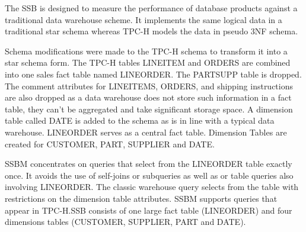 The  SSB  is  designed  to  measure the performance  of  database products  against  a  traditional  data  warehouse  scheme.  It  implements  the  same  logical  data  in  a  traditional  star  schema whereas TPC-H models the data in pseudo 3NF schema.

Schema  modifications  were  made  to  the  TPC-H  schema to transform  it  into  a star  schema  form.  The TPC-H tables LINEITEM and ORDERS are combined into one sales fact table named LINEORDER. The PARTSUPP table  is  dropped.  The comment  attributes  for LINEITEMS, ORDERS,  and  shipping instructions  are  also  dropped  as  a  data  warehouse  does  not store such information in a fact table, they can’t be aggregated and take significant storage space. A  dimension  table  called DATE is  added  to  the  schema as  is  in  line  with  a  typical  data  warehouse. LINEORDER serves  as  a  central  fact  table.  Dimension Tables  are  created  for CUSTOMER, PART, SUPPLIER and DATE.

SSBM concentrates on queries that select from the LINEORDER table  exactly  once.  It  avoids   the use  of  self-joins  or  subqueries  as  well  as  or  table  queries also  involving LINEORDER.  The  classic  warehouse  query selects  from  the  table  with  restrictions  on  the  dimension table attributes. SSBM supports queries that appear in TPC-H.SSB consists of one large fact table (LINEORDER) and four dimensions tables (CUSTOMER, SUPPLIER, PART and DATE).
